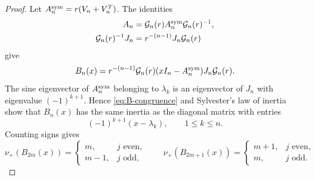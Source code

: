 \documentclass[a4paper,preprint,12pt,nopreprintline,sort&compress]{elsarticle}
\numberwithin{equation}{section}
\theoremstyle{remark}
\begin{document}
\begin{proof}
Let \(A_n^{\rm sym}=r(V_n+V_n^T)\).  The identities
\[
 \begin{aligned}
 A_n&=\mathcal G_n(r)A_n^{\rm sym}\mathcal G_n(r)^{-1},\\
 \mathcal G_n(r)^{-1}J_n
 &=r^{-(n-1)}J_n\mathcal G_n(r)
 \end{aligned}
\]
give
\begin{equation}\label{eq:B-congruence}
 B_n(x)=r^{-(n-1)}\mathcal G_n(r)(xI_n-A_n^{\rm sym})
 J_n\mathcal G_n(r).
\end{equation}
The sine eigenvector of \(A_n^{\rm sym}\) belonging to \(\lambda_k\) is an
eigenvector of \(J_n\) with eigenvalue \((-1)^{k+1}\).  Hence
\eqref{eq:B-congruence} and Sylvester's law of inertia show that
\(B_n(x)\) has the same inertia as the diagonal matrix with entries
\[
 (-1)^{k+1}(x-\lambda_k),\qquad 1\leq k\leq n.
\]
Counting signs gives
\begin{equation}\label{eq:middle-inertia}
 \nu_+(B_{2m}(x))=
 \begin{cases}m,&j\text{ even},\\m-1,&j\text{ odd},\end{cases}
 \qquad
 \nu_+(B_{2m+1}(x))=
 \begin{cases}m+1,&j\text{ even},\\m,&j\text{ odd}.
 \end{cases}
\end{equation}


\end{proof}
\end{document}
